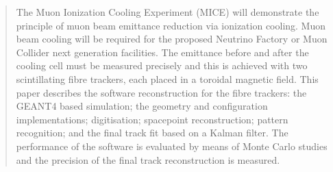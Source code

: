 \begin{quotation}

\noindent
The Muon Ionization Cooling Experiment (MICE) will demonstrate the principle of muon beam emittance reduction via ionization cooling.  Muon beam cooling will be required for the proposed Neutrino Factory or Muon Collider next generation facilities.  The emittance before and after the cooling cell must be measured precisely and this is achieved with two scintillating fibre trackers, each placed in a toroidal magnetic field.  This paper describes the software reconstruction for the fibre trackers: the GEANT4 based simulation; the geometry and configuration implementations; digitisation; spacepoint reconstruction; pattern recognition; and the final track fit based on a Kalman filter. The performance of the software is evaluated by means of Monte Carlo studies and the precision of the final track reconstruction is measured.

\end{quotation}
